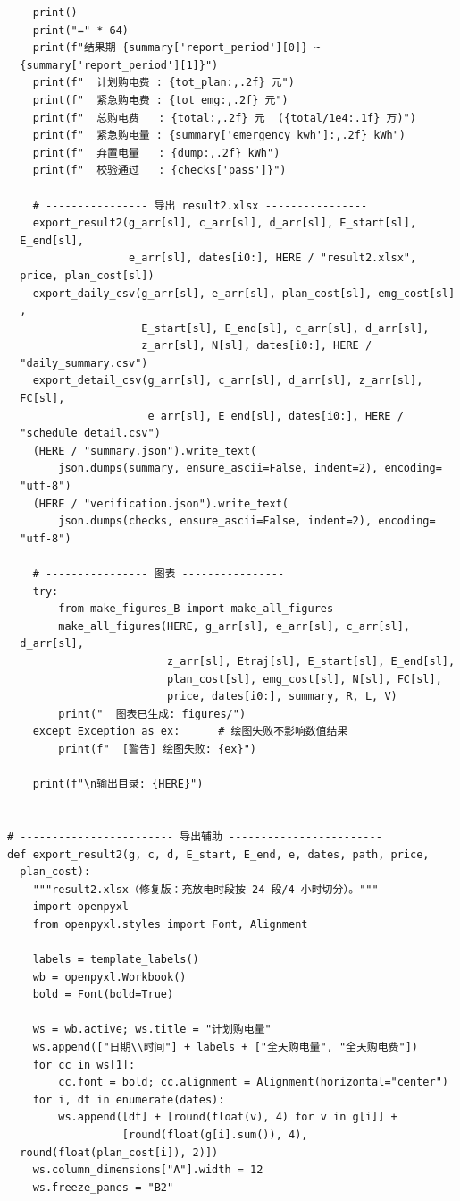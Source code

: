 \begin{verbatim}
    print()
    print("=" * 64)
    print(f"结果期 {summary['report_period'][0]} ~
  {summary['report_period'][1]}")
    print(f"  计划购电费 : {tot_plan:,.2f} 元")
    print(f"  紧急购电费 : {tot_emg:,.2f} 元")
    print(f"  总购电费   : {total:,.2f} 元  ({total/1e4:.1f} 万)")
    print(f"  紧急购电量 : {summary['emergency_kwh']:,.2f} kWh")
    print(f"  弃置电量   : {dump:,.2f} kWh")
    print(f"  校验通过   : {checks['pass']}")

    # ---------------- 导出 result2.xlsx ----------------
    export_result2(g_arr[sl], c_arr[sl], d_arr[sl], E_start[sl],
  E_end[sl],
                   e_arr[sl], dates[i0:], HERE / "result2.xlsx",
  price, plan_cost[sl])
    export_daily_csv(g_arr[sl], e_arr[sl], plan_cost[sl], emg_cost[sl]
  ,
                     E_start[sl], E_end[sl], c_arr[sl], d_arr[sl],
                     z_arr[sl], N[sl], dates[i0:], HERE /
  "daily_summary.csv")
    export_detail_csv(g_arr[sl], c_arr[sl], d_arr[sl], z_arr[sl],
  FC[sl],
                      e_arr[sl], E_end[sl], dates[i0:], HERE /
  "schedule_detail.csv")
    (HERE / "summary.json").write_text(
        json.dumps(summary, ensure_ascii=False, indent=2), encoding=
  "utf-8")
    (HERE / "verification.json").write_text(
        json.dumps(checks, ensure_ascii=False, indent=2), encoding=
  "utf-8")

    # ---------------- 图表 ----------------
    try:
        from make_figures_B import make_all_figures
        make_all_figures(HERE, g_arr[sl], e_arr[sl], c_arr[sl],
  d_arr[sl],
                         z_arr[sl], Etraj[sl], E_start[sl], E_end[sl],
                         plan_cost[sl], emg_cost[sl], N[sl], FC[sl],
                         price, dates[i0:], summary, R, L, V)
        print("  图表已生成: figures/")
    except Exception as ex:      # 绘图失败不影响数值结果
        print(f"  [警告] 绘图失败: {ex}")

    print(f"\n输出目录: {HERE}")


# ------------------------ 导出辅助 ------------------------
def export_result2(g, c, d, E_start, E_end, e, dates, path, price,
  plan_cost):
    """result2.xlsx（修复版：充放电时段按 24 段/4 小时切分）。"""
    import openpyxl
    from openpyxl.styles import Font, Alignment

    labels = template_labels()
    wb = openpyxl.Workbook()
    bold = Font(bold=True)

    ws = wb.active; ws.title = "计划购电量"
    ws.append(["日期\\时间"] + labels + ["全天购电量", "全天购电费"])
    for cc in ws[1]:
        cc.font = bold; cc.alignment = Alignment(horizontal="center")
    for i, dt in enumerate(dates):
        ws.append([dt] + [round(float(v), 4) for v in g[i]] +
                  [round(float(g[i].sum()), 4),
  round(float(plan_cost[i]), 2)])
    ws.column_dimensions["A"].width = 12
    ws.freeze_panes = "B2"


\end{verbatim}
